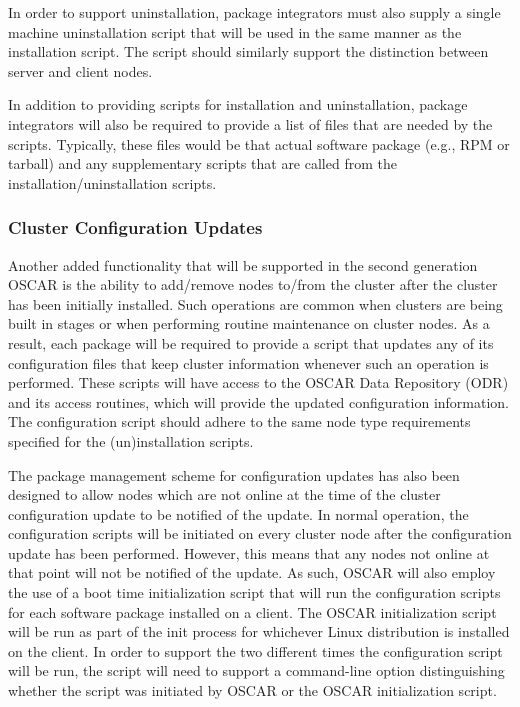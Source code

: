 In order to support uninstallation, package integrators must also
supply a single machine uninstallation script that will be used in the
same manner as the installation script. The script should similarly
support the distinction between server and client nodes.

In addition to providing scripts for installation and uninstallation,
package integrators will also be required to provide a list of files
that are needed by the scripts.  Typically, these files would be that
actual software package (e.g., RPM or tarball) and any supplementary
scripts that are called from the installation/uninstallation scripts.

\subsubsection{Cluster Configuration Updates}

Another added functionality that will be supported in the second
generation OSCAR is the ability to add/remove nodes to/from the
cluster after the cluster has been initially installed. Such
operations are common when clusters are being built in stages or when
performing routine maintenance on cluster nodes. As a result, each
package will be required to provide a script that updates any of its
configuration files that keep cluster information whenever such an
operation is performed. These scripts will have access to the OSCAR
Data Repository (ODR) and its access routines, which will provide the
updated configuration information. The configuration script should
adhere to the same node type requirements specified for the
(un)installation scripts.

The package management scheme for configuration updates has also been
designed to allow nodes which are not online at the time of the
cluster configuration update to be notified of the update. In normal
operation, the configuration scripts will be initiated on every
cluster node after the configuration update has been
performed. However, this means that any nodes not online at that point
will not be notified of the update. As such, OSCAR will also employ
the use of a boot time initialization script that will run the
configuration scripts for each software package installed on a
client. The OSCAR initialization script will be run as part of the
init process for whichever Linux distribution is installed on the
client. In order to support the two different times the configuration
script will be run, the script will need to support a command-line
option distinguishing whether the script was initiated by OSCAR or the
OSCAR initialization script.

